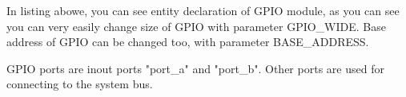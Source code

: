 In listing abowe, you can see entity declaration of GPIO module, as you can see
you can very easily change size of GPIO with parameter GPIO\_WIDE. Base address
of GPIO can be changed too, with parameter BASE\_ADDRESS.

GPIO ports are inout ports "port\_a" and "port\_b". Other ports are used for
connecting to the system bus.

